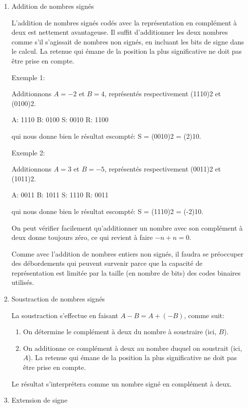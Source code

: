 \documentclass[letter, oneside]{book}
\begin{document}
\begin{enumerate}
\item Addition de nombres signés
\label{sec:orgf1dc079}

L'addition de nombres signés codés avec la représentation en complément
à deux est nettement avantageuse. Il suffit d'additionner les deux
nombres comme s'il s'agissait de nombres non signés, en incluant les
bits de signe dans le calcul. La retenue qui émane de la position la
plus significative ne doit pas être prise en compte. 

Exemple 1:

Additionnons \(A=-2\) et \(B=4\), représentés respectivement (1110)2 et (0100)2.

A: 1110
B: 0100
S: 0010
R: 1100

qui nous donne bien le résultat escompté: S = (0010)2 = (2)10.

Exemple 2:

Additionnons \(A=3\) et \(B=-5\), représentés respectivement (0011)2 et (1011)2.

A: 0011
B: 1011
S: 1110
R: 0011

qui nous donne bien le résultat escompté: S = (1110)2 = (-2)10.

On peut vérifier facilement qu'additionner un nombre avec son
complément à deux donne toujours zéro, ce qui revient à faire \(-n + n
= 0\).

Comme avec l'addition de nombres entiers non signés, il faudra se
préoccuper des débordements qui peuvent survenir parce que la capacité
de représentation est limitée par la taille (en nombre de bits) des
codes binaires utilisés.

\item Soustraction de nombres signés
\label{sec:org1427a7b}

La soustraction s'effectue en faisant \(A - B = A + (-B)\), comme suit:

\begin{enumerate}
\item On détermine le complément à deux du nombre à soustraire (ici, \(B\)).
\item On additionne ce complément à deux au nombre duquel on soustrait  (ici, \(A\)). La
retenue qui émane de la position la plus significative ne doit pas
être prise en compte.
\end{enumerate}

Le résultat s'interprétera comme un nombre signé en complément à deux. 

\item Extension de signe
\label{sec:org64f3580}


\end{enumerate}
\end{document}
